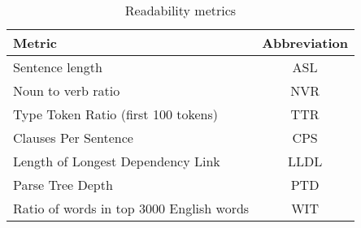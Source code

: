 \begin{table}[ht]
    \centering
    \begin{tabular}{p{110px}c}
        \hline
        \textbf{Metric} & \textbf{Abbreviation} \\
        \hline
        Sentence length & ASL \\
        \hline
        Noun to verb ratio & NVR \\
        \hline
        Type Token Ratio (first 100 tokens) & TTR \\
        \hline
        Clauses Per Sentence & CPS \\
        \hline
        Length of Longest Dependency Link & LLDL \\
        \hline
        Parse Tree Depth & PTD \\
        \hline
        Ratio of words in top 3000 English words & WIT \\
        \hline
    \end{tabular}
    \caption{Readability metrics}
    \label{tab:metrics}
\end{table}
